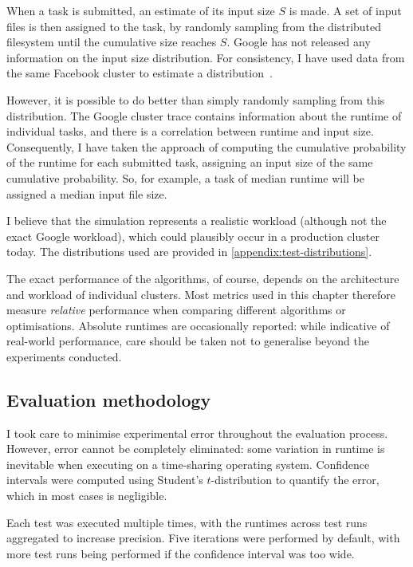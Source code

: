 When a task is submitted, an estimate of its input size $S$ is made. A set of input files is then assigned to the task, by randomly sampling from the distributed filesystem until the cumulative size reaches $S$. Google has not released any information on the input size distribution. For consistency, I have used data from the same Facebook cluster to estimate a distribution~\cite{Chen:2012}.

However, it is possible to do better than simply randomly sampling from this distribution. The Google cluster trace contains information about the runtime of individual tasks, and there is a correlation between runtime and input size. Consequently, I have taken the approach of computing the cumulative probability of the runtime for each submitted task, assigning an input size of the same cumulative probability. So, for example, a task of median runtime will be assigned a median input file size.

I believe that the simulation represents a realistic workload (although not the exact Google workload), which could plausibly occur in a production cluster today. The distributions used are provided in \cref{appendix:test-distributions}.

The exact performance of the algorithms, of course, depends on the architecture and workload of individual clusters. Most metrics used in this chapter therefore measure \emph{relative} performance when comparing different algorithms or optimisations. Absolute runtimes are occasionally reported: while indicative of real-world performance, care should be taken not to generalise beyond the experiments conducted.

\subsection{Evaluation methodology} \label{sec:eval-benchmark-strategy-methodology}

I took care to minimise experimental error throughout the evaluation process. However, error cannot be completely eliminated: some variation in runtime is inevitable when executing on a time-sharing operating system. Confidence intervals were computed using Student's $t$-distribution to quantify the error, which in most cases is negligible.

Each test was executed multiple times, with the runtimes across test runs aggregated to increase precision. Five iterations were performed by default, with more test runs being performed if the confidence interval was too wide.


